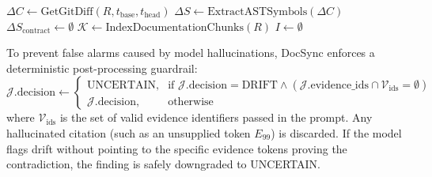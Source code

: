 \documentclass[12pt,onecolumn,draftclsnofoot]{IEEEtran}
\begin{document}
\begin{algorithm}[t]
\caption{DocSync Drift Verification and Remediation}
\label{alg:drift_detection}
$\Delta C \leftarrow \text{GetGitDiff}(R, t_{\text{base}}, t_{\text{head}})$\;
$\Delta S \leftarrow \text{ExtractASTSymbols}(\Delta C)$\;
$\Delta S_{\text{contract}} \leftarrow \emptyset$\;
$\mathcal{K} \leftarrow \text{IndexDocumentationChunks}(R)$\;
$I \leftarrow \emptyset$\;
\;
\end{algorithm}

To prevent false alarms caused by model hallucinations, DocSync enforces a deterministic post-processing guardrail:
\begin{equation}
\mathcal{J}.\text{decision} \leftarrow \begin{cases}
\text{UNCERTAIN}, & \text{if } \mathcal{J}.\text{decision} = \text{DRIFT} \land (\mathcal{J}.\text{evidence\_ids} \cap \mathcal{V}_{\text{ids}} = \emptyset) \\
\mathcal{J}.\text{decision}, & \text{otherwise}
\end{cases}
\end{equation}
where $\mathcal{V}_{\text{ids}}$ is the set of valid evidence identifiers passed in the prompt. Any hallucinated citation (such as an unsupplied token $E_{99}$) is discarded. If the model flags drift without pointing to the specific evidence tokens proving the contradiction, the finding is safely downgraded to UNCERTAIN.
\end{document}
